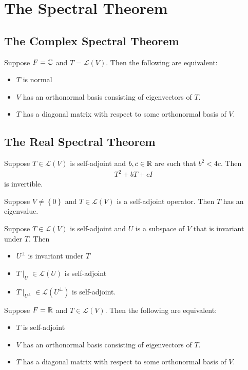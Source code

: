 \documentclass{memoir}
\begin{document}
\section{The Spectral Theorem}
\label{sec:the_spectral_theorem}

\subsection{The Complex Spectral Theorem}
\label{subsec:the_complex_spectral_theorem}

\begin{thm}
	Suppose \(F = \mathbb{C}\) and \(T = \mathcal{L}(V)\). Then the following are equivalent:
	\begin{itemize}
		\item \(T\) is normal
		\item \(V\) has an orthonormal basis consisting of eigenvectors of \(T\).
		\item \(T\) has a diagonal matrix with respect to some orthonormal basis of \(V\).
	\end{itemize}
\end{thm}

\subsection{The Real Spectral Theorem}
\label{subsec:the_real_spectral_theorem}

\begin{lemma}
	Suppose \(T \in \mathcal{L}(V)\) is self-adjoint and \(b,c \in \mathbb{R}\) are such that \(b^2< 4c\). Then
	\begin{align*}
		T^2+bT+cI
	\end{align*}
is invertible.
\end{lemma}
\begin{lemma}
	Suppose \(V \neq \left\{ 0 \right\} \) and \(T \in \mathcal{L}(V)\) is a self-adjoint operator. Then \(T\) has an eigenvalue.
\end{lemma}
\begin{lemma}
	Suppose \(T \in \mathcal{L}(V)\) is self-adjoint and \(U\) is a subspace of \(V\) that is invariant under \(T\). Then
	\begin{itemize}
		\item \(U^{\perp}\) is invariant under \(T\) 
		\item \(T\mid_U \in \mathcal{L}(U)\) is self-adjoint
		\item \(T\mid_{U^{\perp}} \in \mathcal{L}(U^{\perp})\) is self-adjoint.
	\end{itemize}
\end{lemma}
\begin{thm}
	Suppose \(F = \mathbb{R}\) and \(T \in \mathcal{L}(V)\). Then the following are equivalent:
	\begin{itemize}
		\item \(T\) is self-adjoint
		\item \(V\) has an orthonormal basis consisting of eigenvectors of \(T\).
		\item \(T \) has a diagonal matrix with respect to some orthonormal basis of \(V\).
	\end{itemize}
\end{thm}
\end{document}
